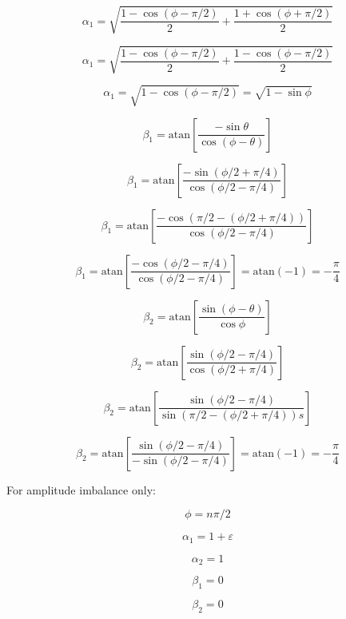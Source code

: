\documentclass{article}
\begin{document}
\begin{equation}
	\alpha_1 = \sqrt{\frac{1-\cos(\phi-\pi/2)}{2}+\frac{1+\cos(\phi+\pi/2)}{2}}
\end{equation}

\begin{equation}
	\alpha_1 = \sqrt{\frac{1-\cos(\phi-\pi/2)}{2}+\frac{1-\cos(\phi-\pi/2)}{2}}
\end{equation}

\begin{equation}
	\alpha_1 = \sqrt{1-\cos(\phi-\pi/2)} = \sqrt{1-\sin\phi}
\end{equation}

\begin{equation}
	\beta_1 = \text{atan}\left[\frac{-\sin\theta}{\cos(\phi-\theta)}\right]
\end{equation}

\begin{equation}
	\beta_1 = \text{atan}\left[\frac{-\sin(\phi/2+\pi/4)}{\cos(\phi/2-\pi/4)}\right]
\end{equation}

\begin{equation}
	\beta_1 = \text{atan}\left[\frac{-\cos(\pi/2-(\phi/2+\pi/4))}{\cos(\phi/2-\pi/4)}\right]
\end{equation}

\begin{equation}
	\beta_1 = \text{atan}\left[\frac{-\cos(\phi/2-\pi/4)}{\cos(\phi/2-\pi/4)}\right] = \text{atan}(-1) = -\frac{\pi}{4}
\end{equation}

\begin{equation}
	\beta_2 = \text{atan}\left[\frac{\sin(\phi-\theta)}{\cos\phi}\right]
\end{equation}

\begin{equation}
	\beta_2 = \text{atan}\left[\frac{\sin(\phi/2-\pi/4)}{\cos(\phi/2+\pi/4)}\right]
\end{equation}

\begin{equation}
	\beta_2 = \text{atan}\left[\frac{\sin(\phi/2-\pi/4)}{\sin(\pi/2-(\phi/2+\pi/4))s}\right]
\end{equation}

\begin{equation}
	\beta_2 = \text{atan}\left[\frac{\sin(\phi/2-\pi/4)}{-\sin(\phi/2-\pi/4)}\right] = \text{atan}(-1) = -\frac{\pi}{4}
\end{equation}

For amplitude imbalance only:

\begin{equation}
	\phi = n\pi/2
\end{equation}

\begin{equation}
	\alpha_1 = 1 + \varepsilon
\end{equation}

\begin{equation}
	\alpha_2 = 1
\end{equation}

\begin{equation}
	\beta_1 = 0
\end{equation}

\begin{equation}
	\beta_2 = 0
\end{equation}
\end{document}

